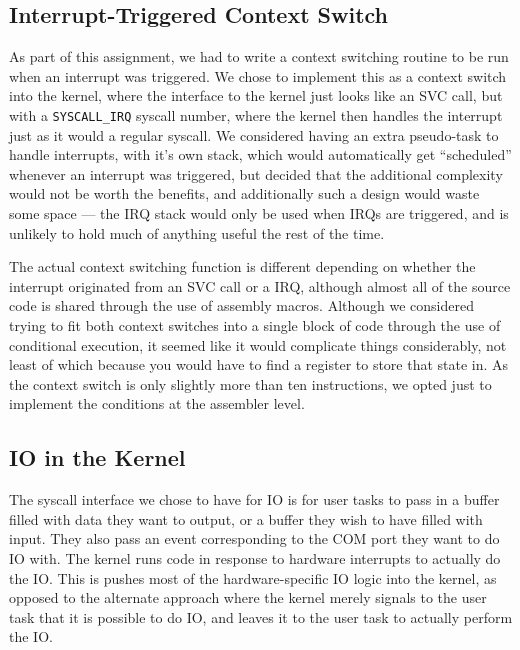 \documentclass[titlepage]{article}
\begin{document}
\subsection{Interrupt-Triggered Context Switch}
As part of this assignment, we had to write a context switching
routine to be run when an interrupt was triggered.
We chose to implement this as a context switch into the kernel, where the interface to the kernel just looks
like an SVC call, but with a \texttt{SYSCALL\_IRQ} syscall number, where the kernel then
handles the interrupt just as it would a regular syscall. We considered having
an extra pseudo-task to handle interrupts, with it's own stack, which would
automatically get ``scheduled'' whenever an interrupt was triggered, but decided
that the additional complexity would not be worth the benefits, and additionally
such a design would waste some space --- the IRQ stack would only be used when
IRQs are triggered, and is unlikely to hold much of anything useful the rest
of the time.

The actual context switching function is different depending on whether the
interrupt originated from an SVC call or a IRQ, although almost all of the
source code is shared through the use of assembly macros. Although we considered
trying to fit both context switches into a single block of code through the use
of conditional execution, it seemed like it would complicate things
considerably, not least of which because you would have to find a register to
store that state in. As the context switch is only slightly more than ten
instructions, we opted just to implement the conditions at the assembler level.



\subsection{IO in the Kernel}
The syscall interface we chose to have for IO is for user tasks to pass in a buffer
filled with data they want to output, or a buffer they wish to have filled with input.
They also pass an event corresponding to the COM port they want to do IO with.
The kernel runs code in response to hardware interrupts to actually do the IO.
This is pushes most of the hardware-specific IO logic into the kernel, as opposed to
the alternate approach where the kernel merely signals to the user task that it is possible
to do IO, and leaves it to the user task to actually perform the IO.
\end{document}
